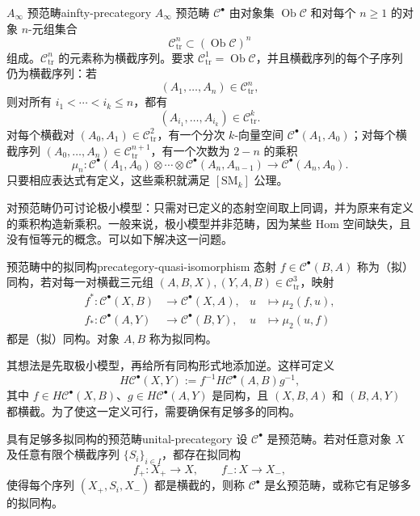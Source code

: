 \begin{definition}{$A_\infty$ 预范畴}{ainfty-precategory}
$A_\infty$ 预范畴 $\mathcal C^\bullet$ 由对象集 $\operatorname{Ob}\mathcal C$ 和对每个 $n\geq1$ 的对象 $n$-元组集合
\[
  \mathcal C^n_{\mathrm{tr}}\subset(\operatorname{Ob}\mathcal C)^n
\]
组成。$\mathcal C^n_{\mathrm{tr}}$ 的元素称为横截序列。要求 $\mathcal C^1_{\mathrm{tr}}=\operatorname{Ob}\mathcal C$，并且横截序列的每个子序列仍为横截序列：若
\[
  (A_1,\ldots,A_n)\in\mathcal C^n_{\mathrm{tr}},
\]
则对所有 $i_1<\cdots<i_k\leq n$，都有
\[
  (A_{i_1},\ldots,A_{i_k})\in\mathcal C^k_{\mathrm{tr}}.
\]
对每个横截对 $(A_0,A_1)\in\mathcal C^2_{\mathrm{tr}}$，有一个分次 $k$-向量空间 $\mathcal C^\bullet(A_1,A_0)$；对每个横截序列 $(A_0,\ldots,A_n)\in\mathcal C^{n+1}_{\mathrm{tr}}$，有一个次数为 $2-n$ 的乘积
\[
  \mu_n\colon\mathcal C^\bullet(A_1,A_0)\otimes\cdots\otimes
  \mathcal C^\bullet(A_n,A_{n-1})\longrightarrow\mathcal C^\bullet(A_n,A_0).
\]
只要相应表达式有定义，这些乘积就满足 $[\mathrm{SM}_k]$ 公理。
\end{definition}

对预范畴仍可讨论极小模型：只需对已定义的态射空间取上同调，并为原来有定义的乘积构造新乘积。一般来说，极小模型并非范畴，因为某些 Hom 空间缺失，且没有恒等元的概念。可以如下解决这一问题。

\begin{definition}{预范畴中的拟同构}{precategory-quasi-isomorphism}
态射 $f\in\mathcal C^\bullet(B,A)$ 称为（拟）同构，若对每一对横截三元组 $(A,B,X),(Y,A,B)\in\mathcal C^3_{\mathrm{tr}}$，映射
\[
  \begin{aligned}
    f^*\colon\mathcal C^\bullet(X,B)&\longrightarrow\mathcal C^\bullet(X,A),
    &u&\longmapsto\mu_2(f,u),\\
    f_*\colon\mathcal C^\bullet(A,Y)&\longrightarrow\mathcal C^\bullet(B,Y),
    &u&\longmapsto\mu_2(u,f)
  \end{aligned}
\]
都是（拟）同构。对象 $A,B$ 称为拟同构。
\end{definition}

其想法是先取极小模型，再给所有同构形式地添加逆。这样可定义
\[
  H\mathcal C^\bullet(X,Y):=f^{-1}H\mathcal C^\bullet(A,B)g^{-1},
\]
其中 $f\in H\mathcal C^\bullet(X,B)$、$g\in H\mathcal C^\bullet(A,Y)$ 是同构，且 $(X,B,A)$ 和 $(B,A,Y)$ 都横截。为了使这一定义可行，需要确保有足够多的同构。

\begin{definition}{具有足够多拟同构的预范畴}{unital-precategory}
设 $\mathcal C^\bullet$ 是预范畴。若对任意对象 $X$ 及任意有限个横截序列 $\{S_i\}_{i\in I}$，都存在拟同构
\[
  f_+\colon X_+\to X,\qquad f_-\colon X\to X_-,
\]
使得每个序列 $(X_+,S_i,X_-)$ 都是横截的，则称 $\mathcal C^\bullet$ 是幺预范畴，或称它有足够多的拟同构。
\end{definition}

